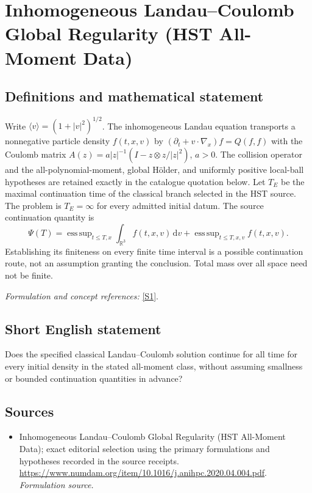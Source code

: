 \documentclass[11pt]{article}
\begin{document}
\section*{\texorpdfstring{Inhomogeneous Landau–Coulomb Global Regularity (HST All-Moment Data)}{Inhomogeneous Landau–Coulomb Global Regularity (HST All-Moment Data)}}\label{statement}
\subsection{Definitions and mathematical statement}
Write $\langle v\rangle=(1+|v|^2)^{1/2}$. The inhomogeneous Landau equation transports a nonnegative particle density $f(t,x,v)$ by
$(\partial_t+v\cdot\nabla_x)f=Q(f,f)$ with the Coulomb matrix
$A(z)=a|z|^{-1}(I-z\otimes z/|z|^2)$, $a>0$. The collision operator and the all-polynomial-moment, global H\"older, and uniformly positive local-ball hypotheses are retained exactly in the catalogue quotation below. Let $T_E$ be the maximal continuation time of the classical branch selected in the HST source. The problem is $T_E=\infty$ for every admitted initial datum. The source continuation quantity is
\[
 \Psi(T)=\mathop{\mathrm{ess\,sup}}_{t\le T,x}\int_{{\mathbb{R}}^3}f(t,x,v){\,\mathrm{d}} v
 +\mathop{\mathrm{ess\,sup}}_{t\le T,x,v}f(t,x,v).
\]
Establishing its finiteness on every finite time interval is a possible continuation route, not an assumption granting the conclusion. Total mass over all space need not be finite.
\par\smallskip\textit{Formulation and concept references:} \href{https://www.numdam.org/item/10.1016/j.anihpc.2020.04.004.pdf}{[S1]}.

\subsection{Short English statement}
Does the specified classical Landau–Coulomb solution continue for all time for every initial density in the stated all-moment class, without assuming smallness or bounded continuation quantities in advance?
\subsection{Sources}
\begin{itemize}
\item[S1]Inhomogeneous Landau–Coulomb Global Regularity (HST All-Moment Data); exact editorial selection using the primary formulations and hypotheses recorded in the source receipts.
\url{https://www.numdam.org/item/10.1016/j.anihpc.2020.04.004.pdf}.
\textit{Formulation source.}
\end{itemize}
\end{document}
